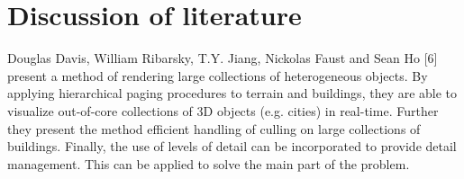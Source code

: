 \chapter{Discussion of literature}
\label{chap:DiscussionOfLiterature}
Douglas Davis, William Ribarsky, T.Y. Jiang, Nickolas Faust and Sean Ho [6] present a method of rendering large collections of heterogeneous objects. By applying hierarchical paging procedures to terrain and buildings, they are able to visualize out-of-core collections of 3D objects (e.g. cities) in real-time.  Further they present the method efficient handling of culling on large collections of buildings. Finally, the use of levels of detail can be incorporated to provide detail management. This can be applied to solve the main part of the problem. 